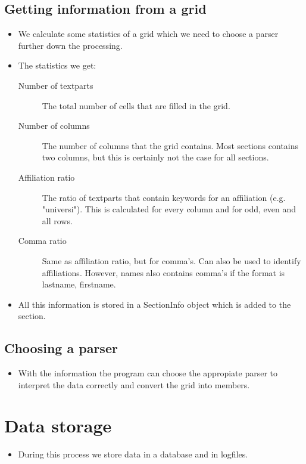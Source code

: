 \documentclass{ou-report}
\begin{document}
\subsection{Getting information from a grid}
\begin{itemize}
    \item We calculate some statistics of a grid which we need to choose a
        parser further down the processing.
    \item The statistics we get:
    \begin{description}
        \item[Number of textparts] The total number of cells that are filled in
            the grid.
        \item[Number of columns] The number of columns that the grid contains.
            Most sections contains two columns, but this is certainly not the 
            case for all sections.
        \item[Affiliation ratio] The ratio of textparts that contain keywords 
            for an affiliation (e.g. "universi"). This is calculated for every 
            column and for odd, even and all rows.
        \item[Comma ratio] Same as affiliation ratio, but for comma's. Can also
            be used to identify affiliations. However, names also contains 
            comma's if the format is lastname, firstname.
    \end{description}
    \item All this information is stored in a SectionInfo object which is added
        to the section.
\end{itemize}

\subsection{Choosing a parser}
\begin{itemize}
    \item With the information the program can choose the appropiate parser to
        interpret the data correctly and convert the grid into members.
\end{itemize}

\section{Data storage}
\begin{itemize}
    \item During this process we store data in a database and in logfiles.
\end{itemize}
\end{document}
